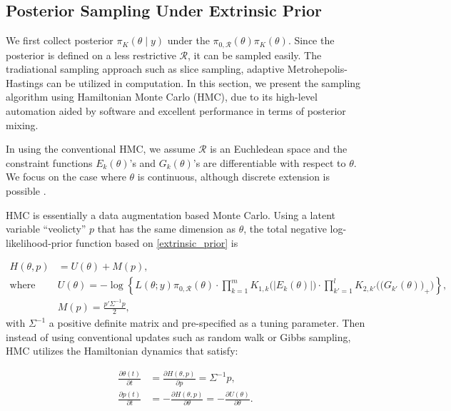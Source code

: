 \documentclass[10pt]{article}
\newcommand{\mc}[1]{\mathcal{#1}}
\begin{document}
\subsection{Posterior Sampling Under Extrinsic Prior}

We first collect posterior $\pi_K(\theta \mid y)$ under the $\pi_{0,\mc R}(\theta) \pi_K(\theta)$. Since the posterior is defined on a less restrictive $\mc R$, it can be sampled easily. The tradiational sampling approach such as slice sampling, adaptive Metrohepolis-Hastings can be utilized in computation. In this section, we present the sampling algorithm using Hamiltonian Monte Carlo (HMC), due to its high-level automation aided by software and excellent performance in terms of posterior mixing.

In using the conventional HMC, we assume $\mc R$ is an Euchledean space and the constraint functions $E_k(\theta)$'s and $G_k(\theta)$'s  are differentiable with respect to $\theta$. We focus on the case where $\theta$ is continuous, although discrete extension is possible \citep{zhang2012continuous}.

HMC is essentially a data augmentation based Monte Carlo. Using a latent variable ``veolicty'' $p$ that has the same dimension as $\theta$, the total negative log-likelihood-prior function based on \eqref{extrinsic_prior} is

\begin{equation}
\begin{aligned}
H(\theta, p)& = U(\theta)+M(p),\\
\text{where } & U(\theta) = -\log\left\{ L(\theta;y)\pi_{0,\mc R}(\theta) \cdot \prod_{k=1}^{m} K_{1,k}\Big( | E_k(\theta)| \Big) \cdot \prod_{k'=1}^{l} K_{2,k'}\Big( \big( G_{k'}(\theta) \big)_+ \Big) \right\},\\
& M(p) = \frac{p'\Sigma^{-1} p}{2},\end{aligned}
\end{equation}
with $\Sigma^{-1}$ a positive definite matrix and pre-specified as a tuning parameter. Then instead of using conventional updates such as random walk or Gibbs sampling, HMC utilizes the Hamiltonian dynamics that satisfy:

\begin{equation}
\begin{aligned}
\label{hamiltonian}
\frac{\partial \theta (t)}{\partial t} & =\frac{\partial H(\theta, p)}{\partial p} = \Sigma^{-1}p,\\
\frac{\partial p(t)}{\partial t}& =-\frac{\partial H(\theta, p)}{\partial \theta} = -\frac{\partial U(\theta)}{\partial \theta}.
\end{aligned}
\end{equation}
\end{document}

